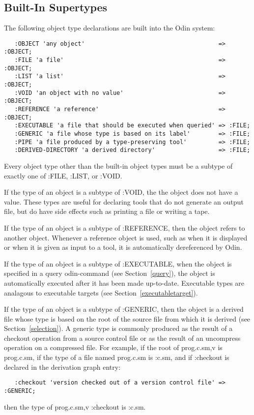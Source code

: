 \subsection{Built-In Supertypes}
\label{builtin}

The following object type declarations are built into the Odin system:
\begin{verbatim}
   :OBJECT 'any object'                                      => :OBJECT;
   :FILE 'a file'                                            => :OBJECT;
   :LIST 'a list'                                            => :OBJECT;
   :VOID 'an object with no value'                           => :OBJECT;
   :REFERENCE 'a reference'                                  => :OBJECT;
   :EXECUTABLE 'a file that should be executed when queried' => :FILE;
   :GENERIC 'a file whose type is based on its label'        => :FILE;
   :PIPE 'a file produced by a type-preserving tool'         => :FILE;
   :DERIVED-DIRECTORY 'a derived directory'                  => :FILE;
\end{verbatim}
Every object type other than the built-in object types
must be a subtype of exactly one of
{\ex :FILE}, {\ex :LIST}, or {\ex :VOID}.

If the type of an object is a subtype of {\ex :VOID},
the the object does not have a value.
These types are useful for declaring tools that do not generate an output file,
but do have side effects such as printing a file or writing a tape.

If the type of an object is a subtype of {\ex :REFERENCE},
then the object refers to another object.
Whenever a reference object is used,
such as when it is displayed or when it is given as input to a tool,
it is automatically dereferenced by Odin.

If the type of an object is a subtype of {\ex :EXECUTABLE},
when the object is specified in a query odin-command (see Section~\ref{query}),
the object is automatically executed
after it has been made up-to-date.
Executable types are analagous to executable targets
(see Section~\ref{executabletarget}).

If the type of an object is a subtype of {\ex :GENERIC},
then the object is a derived file whose type
is based on the root of the source file from which it is derived
(see Section~\ref{selection}).
A generic type is commonly produced as the result of a checkout
operation from a source control file
or as the result of an uncompress operation on a compressed file.
For example, if the root of {\ex prog.c.sm,v} is {\ex prog.c.sm},
if the type of a file named {\ex prog.c.sm} is {\ex :c.sm},
and if {\ex :checkout} is declared in the derivation graph entry:
\begin{verbatim}
   :checkout 'version checked out of a version control file' => :GENERIC;
\end{verbatim}
then the type of {\ex prog.c.sm,v :checkout} is {\ex :c.sm}.

